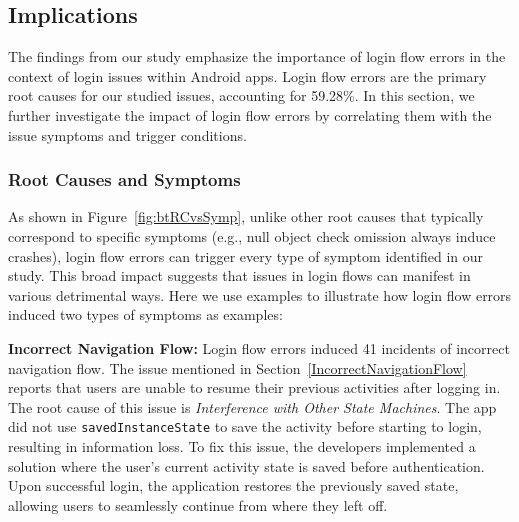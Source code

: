 \subsection{Implications}

The findings from our study emphasize the importance of login flow errors in the context of login issues within Android apps. Login flow errors are the primary root causes for our studied issues, accounting for 59.28\%. %
In this section, we further investigate the impact of login flow errors by correlating them with the issue symptoms and trigger conditions.
\subsubsection{Root Causes and Symptoms}
As shown in Figure~\ref{fig:btRCvsSymp}, unlike other root causes that typically correspond to specific symptoms (e.g., null object check omission always induce crashes), login flow errors can trigger every type of symptom identified in our study. This broad impact suggests that issues in login flows can manifest in various detrimental ways.
Here we use examples to illustrate how login flow errors induced two types of symptoms as examples:

\textbf{Incorrect Navigation Flow:} Login flow errors induced 41 incidents of incorrect navigation flow.  The issue mentioned in Section~\ref{IncorrectNavigationFlow} reports that users are unable to resume their previous activities after logging in.  The root cause of this issue is \textit{Interference with Other State Machines}. The app did not use \texttt{savedInstanceState} to save the activity before starting to login, resulting in information loss. To fix this issue, the developers implemented a solution where the user's current activity state is saved before authentication. Upon successful login, the application restores the previously saved state, allowing users to seamlessly continue from where they left off.

